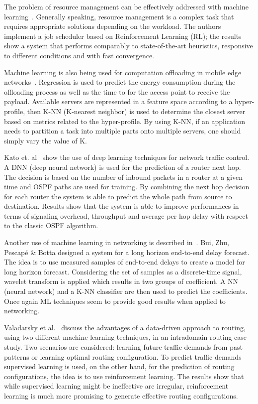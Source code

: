 The problem of resource management can be effectively addressed with machine learning~\cite{mao2016resource}. Generally speaking, resource management is a complex task that requires appropriate solutions depending on the workload. The authors implement a job scheduler based on Reinforcement Learning (RL); the results show a system that performs comparably to state-of-the-art heuristics, responsive to different conditions and with fast convergence.

Machine learning is also being used for computation offloading in mobile edge networks~\cite{crutcher2017hyperprofile}. Regression is used to predict the energy consumption during the offloading process as well as the time to for the access point to receive the payload. Available servers are represented in a feature space according to a hyper-profile, then K-NN (K-nearest neighbor) is used to determine the closest server based on metrics related to the hyper-profile. By using K-NN, if an application needs to partition a task into multiple parts onto multiple servers, one should simply vary the value of K. 

Kato et. al~\cite{deep_learning_heterogeneus} show the use of deep learning techniques for network traffic control. A DNN (deep neural network) is used for the prediction of a router next hop. The decision is based on the number of inbound packets in a router at a given time and OSPF paths are used for training. By combining the next hop decision for each router the system is able to predict the whole path from source to destination. Results show that the system is able to improve performances in terms of signaling overhead, throughput and average per hop delay with respect to the classic OSPF algorithm.

Another use of machine learning in networking is described in~\cite{end-to-end}. Bui, Zhu, Pescapé \& Botta designed a system for a long horizon end-to-end delay forecast. The idea is to use measured samples of end-to-end delays to create a model for long horizon forecast. Considering the set of samples as a discrete-time signal, wavelet transform is applied which results in two groups of coefficient. A NN (neural network) and a K-NN classifier are then used to predict the coefficients. Once again ML techniques seem to provide good results when applied to networking.

Valadarsky et al.~\cite{Valadarsky} discuss the advantages of a data-driven approach to routing, using two different machine learning techniques, in an intradomain routing case study. Two scenarios are considered: learning future traffic demands from past patterns or learning optimal routing configuration. To predict traffic demands supervised learning is used, on the other hand, for the prediction of routing configurations, the idea is to use reinforcement learning. The results show that while supervised learning might be ineffective are irregular, reinforcement learning is much more promising to generate effective routing configurations.